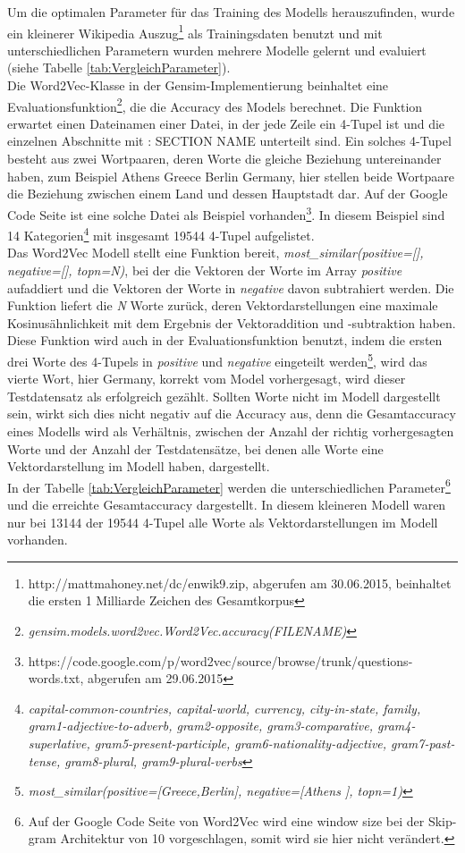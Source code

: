\documentclass[12pt,a4paper]{report}
\begin{document}
Um die optimalen Parameter für das Training des Modells herauszufinden, wurde ein kleinerer Wikipedia Auszug\footnote{http://mattmahoney.net/dc/enwik9.zip, abgerufen am 30.06.2015, beinhaltet die ersten 1 Milliarde Zeichen des Gesamtkorpus} als Trainingsdaten benutzt und mit unterschiedlichen Parametern wurden mehrere Modelle gelernt und evaluiert (siehe Tabelle \ref{tab:VergleichParameter}).\\
Die Word2Vec-Klasse in der Gensim-Implementierung beinhaltet eine Evaluationsfunktion\footnote{\textit{gensim.models.word2vec.Word2Vec.accuracy(FILENAME)}}, die die Accuracy des Models berechnet. Die Funktion erwartet einen Dateinamen einer Datei, in der jede Zeile ein 4-Tupel ist und die einzelnen Abschnitte mit \glqq : SECTION NAME\grqq{} unterteilt sind. Ein solches 4-Tupel besteht aus zwei Wortpaaren, deren Worte die gleiche Beziehung untereinander haben, zum Beispiel \glqq Athens Greece Berlin Germany\grqq , hier stellen beide Wortpaare die Beziehung zwischen einem Land und dessen Hauptstadt dar. Auf der Google Code Seite ist eine solche Datei als Beispiel vorhanden\footnote{https://code.google.com/p/word2vec/source/browse/trunk/questions-words.txt, abgerufen am 29.06.2015}. In diesem Beispiel sind 14 Kategorien\footnote{\textit{capital-common-countries, capital-world, currency, city-in-state, family, gram1-adjective-to-adverb, gram2-opposite, gram3-comparative, gram4-superlative, gram5-present-participle, gram6-nationality-adjective, gram7-past-tense, gram8-plural, gram9-plural-verbs}} mit insgesamt 19544 4-Tupel aufgelistet.\\
Das Word2Vec Modell stellt eine Funktion bereit, \textit{most\_similar(positive=[], negative=[], topn=N)}, bei der die Vektoren der Worte im Array \textit{positive} aufaddiert und die Vektoren der Worte in \textit{negative} davon subtrahiert werden. Die Funktion liefert die \textit{N} Worte zurück, deren Vektordarstellungen eine maximale Kosinusähnlichkeit mit dem Ergebnis der Vektoraddition und -subtraktion haben. Diese Funktion wird auch in der Evaluationsfunktion benutzt, indem die ersten drei Worte des 4-Tupels in \textit{positive} und \textit{negative} eingeteilt werden\footnote{\textit{most\_similar(positive=[\grq Greece\grq,\grq Berlin\grq], negative=[\grq Athens \grq], topn=1)}}, wird das vierte Wort, hier \glqq Germany\grqq, korrekt vom Model vorhergesagt, wird dieser Testdatensatz als erfolgreich gezählt. Sollten Worte nicht im Modell dargestellt sein, wirkt sich dies nicht negativ auf die Accuracy aus, denn die Gesamtaccuracy eines Modells wird als Verhältnis, zwischen der Anzahl der richtig vorhergesagten Worte und der Anzahl der Testdatensätze, bei denen alle Worte eine Vektordarstellung im Modell haben, dargestellt. \\
In der Tabelle \ref{tab:VergleichParameter} werden die unterschiedlichen Parameter\footnote{Auf der Google Code Seite von Word2Vec wird eine window size bei der Skip-gram Architektur von 10 vorgeschlagen, somit wird sie hier nicht verändert.} und die erreichte Gesamtaccuracy dargestellt. In diesem kleineren Modell waren nur bei 13144 der 19544 4-Tupel alle Worte als Vektordarstellungen im Modell vorhanden.
\end{document}
